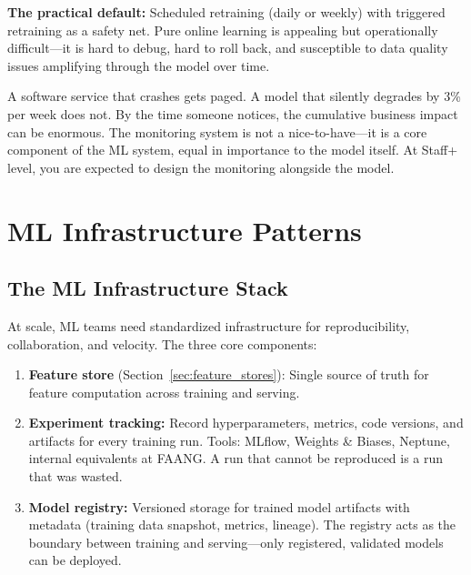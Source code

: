 \textbf{The practical default:} Scheduled retraining (daily or weekly) with triggered retraining as a safety net. Pure online learning is appealing but operationally difficult---it is hard to debug, hard to roll back, and susceptible to data quality issues amplifying through the model over time.

\begin{keyinsight}
A software service that crashes gets paged. A model that silently degrades by 3\% per week does not. By the time someone notices, the cumulative business impact can be enormous. The monitoring system is not a nice-to-have---it is a core component of the ML system, equal in importance to the model itself. At Staff+ level, you are expected to design the monitoring alongside the model.
\end{keyinsight}

\section{ML Infrastructure Patterns}
\label{sec:ml_infra}

\subsection{The ML Infrastructure Stack}

At scale, ML teams need standardized infrastructure for reproducibility, collaboration, and velocity. The three core components:

\begin{enumerate}
    \item \textbf{Feature store} (Section~\ref{sec:feature_stores}): Single source of truth for feature computation across training and serving.
    \item \textbf{Experiment tracking:} Record hyperparameters, metrics, code versions, and artifacts for every training run. Tools: MLflow, Weights \& Biases, Neptune, internal equivalents at FAANG. A run that cannot be reproduced is a run that was wasted.
    \item \textbf{Model registry:} Versioned storage for trained model artifacts with metadata (training data snapshot, metrics, lineage). The registry acts as the boundary between training and serving---only registered, validated models can be deployed.
\end{enumerate}

